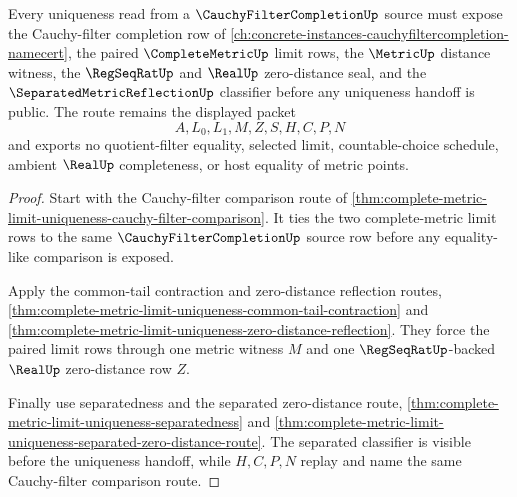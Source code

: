 \begin{theorem}\label{thm:complete-metric-limit-uniqueness-cauchy-filter-real-seal}
Every uniqueness read from a $\CauchyFilterCompletionUp$ source must expose the Cauchy-filter completion row of \autoref{ch:concrete-instances-cauchyfiltercompletion-namecert}, the paired $\CompleteMetricUp$ limit rows, the $\MetricUp$ distance witness, the $\RegSeqRatUp$ and $\RealUp$ zero-distance seal, and the $\SeparatedMetricReflectionUp$ classifier before any uniqueness handoff is public. The route remains the displayed packet
$$
A,L_{0},L_{1},M,Z,S,H,C,P,N
$$
and exports no quotient-filter equality, selected limit, countable-choice schedule, ambient $\RealUp$ completeness, or host equality of metric points.
\end{theorem}
\begin{proof}
Start with the Cauchy-filter comparison route of \autoref{thm:complete-metric-limit-uniqueness-cauchy-filter-comparison}. It ties the two complete-metric limit rows to the same $\CauchyFilterCompletionUp$ source row before any equality-like comparison is exposed.

Apply the common-tail contraction and zero-distance reflection routes, \autoref{thm:complete-metric-limit-uniqueness-common-tail-contraction} and \autoref{thm:complete-metric-limit-uniqueness-zero-distance-reflection}. They force the paired limit rows through one metric witness $M$ and one $\RegSeqRatUp$-backed $\RealUp$ zero-distance row $Z$.

Finally use separatedness and the separated zero-distance route, \autoref{thm:complete-metric-limit-uniqueness-separatedness} and \autoref{thm:complete-metric-limit-uniqueness-separated-zero-distance-route}. The separated classifier is visible before the uniqueness handoff, while $H,C,P,N$ replay and name the same Cauchy-filter comparison route.
\end{proof}
